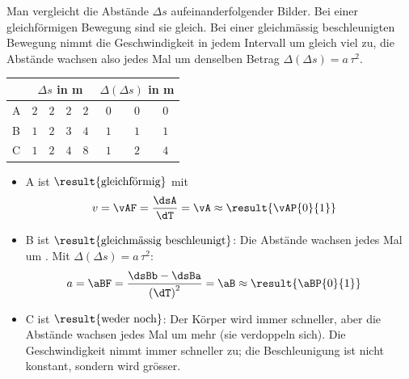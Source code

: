Man vergleicht die Abstände $\Delta s$ aufeinanderfolgender Bilder. Bei einer gleichförmigen Bewegung sind sie gleich. Bei einer gleichmässig beschleunigten Bewegung nimmt die Geschwindigkeit in jedem Intervall um gleich viel zu, die Abstände wachsen also jedes Mal um denselben Betrag $\Delta(\Delta s) = a\,\tau^2$.
\begin{center}
\begin{tabular}{l|cccc|ccc}
 & \multicolumn{4}{c|}{$\Delta s$ in \si{\meter}} & \multicolumn{3}{c}{$\Delta(\Delta s)$ in \si{\meter}} \\
\hline
A & $2$ & $2$ & $2$ & $2$ & $0$ & $0$ & $0$ \\
B & $1$ & $2$ & $3$ & $4$ & $1$ & $1$ & $1$ \\
C & $1$ & $2$ & $4$ & $8$ & $1$ & $2$ & $4$
\end{tabular}
\end{center}
\begin{itemize}
\item A ist $\result{\text{gleichförmig}}$ mit
\begin{align}
 v &= \vAF = \frac{\dsA}{\dT} = \vA \approx \result{\vAP{0}{1}}
\end{align}
\item B ist $\result{\text{gleichmässig beschleunigt}}$: Die Abstände wachsen jedes Mal um \dsBaO. Mit $\Delta(\Delta s) = a\,\tau^2$:
\begin{align}
 a &= \aBF = \frac{\dsBb-\dsBa}{\left(\dT\right)^2} = \aB \approx \result{\aBP{0}{1}}
\end{align}
\item C ist $\result{\text{weder noch}}$: Der Körper wird immer schneller, aber die Abstände wachsen jedes Mal um mehr (sie verdoppeln sich). Die Geschwindigkeit nimmt immer schneller zu; die Beschleunigung ist nicht konstant, sondern wird grösser.
\end{itemize}
